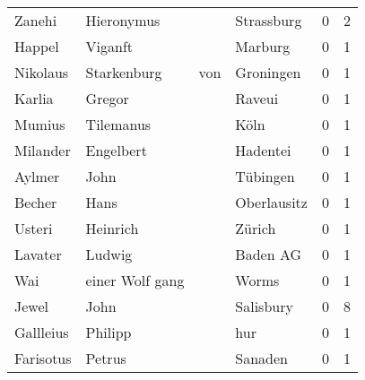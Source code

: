 \begin{center}
\begin{tiny}
\begin{longtabu}{llllrr}
                   Zanehi &                         Hieronymus &             &                                  Strassburg &          0 &         2 \\
                   Happel &                            Viganft &             &                                     Marburg &          0 &         1 \\
                 Nikolaus &                        Starkenburg &         von &                                   Groningen &          0 &         1 \\
                   Karlia &                             Gregor &             &                                      Raveui &          0 &         1 \\
                   Mumius &                          Tilemanus &             &                                        Köln &          0 &         1 \\
                 Milander &                          Engelbert &             &                                    Hadentei &          0 &         1 \\
                   Aylmer &                               John &             &                                    Tübingen &          0 &         1 \\
                   Becher &                               Hans &             &                                 Oberlausitz &          0 &         1 \\
                   Usteri &                           Heinrich &             &                                      Zürich &          0 &         1 \\
                  Lavater &                             Ludwig &             &                                    Baden AG &          0 &         1 \\
                      Wai &                    einer Wolf gang &             &                                       Worms &          0 &         1 \\
                    Jewel &                               John &             &                                   Salisbury &          0 &         8 \\
                Gallleius &                            Philipp &             &                                         hur &          0 &         1 \\
                Farisotus &                             Petrus &             &                                     Sanaden &          0 &         1 \\

\end{longtabu}
\end{tiny}
\end{center}
